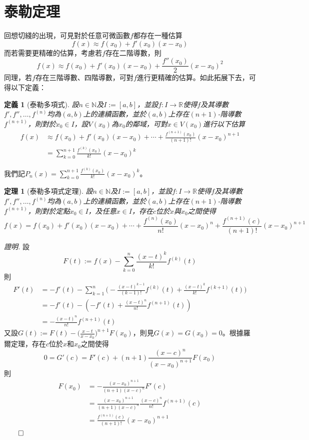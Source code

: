\documentclass[12pt]{article}
\newtheorem{definition}{定義}
\newtheorem*{theorem}{定理}
\renewenvironment*{proof}{\textit{證明.}}{\hfill$\qed$}
\begin{document}
    \section*{泰勒定理}

    回想切綫的出現，可見對於任意可微函數$f$都存在一種估算$$f(x)\approx f(x_0)+f'(x_0)(x-x_0)$$而若需要更精確的估算，考慮若$f$存在二階導數，則$$f(x)\approx f(x_0)+f'(x_0)(x-x_0)+\frac{f''(x_0)}{2}(x-x_0)^2$$同理，若$f$存在三階導數、四階導數，可對$f$進行更精確的估算。如此拓展下去，可得以下定義：

    \begin{definition}[泰勒多項式]
        設$n\in\mathbb{N}$及$I:=[a,b]$，並設$f:I\to\mathbb{R}$使得$f$及其導數$f',f'',\dots,f^{(n)}$均為$(a,b)$上的連續函數，並於$(a,b)$上存在$(n+1)$-階導數$f^{(n+1)}$，則對於$x_0\in I$，設$V(x_0)$為$x_0$的鄰域，可對$x\in V(x_0)$進行以下估算\begin{align*}
            f(x)&\approx f(x_0)+f'(x_0)(x-x_0)+\cdots+\frac{f^{(n+1)}(x_0)}{(n+1)!}(x-x_0)^{n+1}\\
            &=\sum_{k=0}^{n+1}\frac{f^{(k)}(x_0)}{k!}(x-x_0)^k
        \end{align*}
    \end{definition}

    我們記$\displaystyle P_n(x)=\sum_{k=0}^{n+1}\frac{f^{(k)}(x_0)}{k!}(x-x_0)^k$。

    \begin{theorem}[泰勒多項式定理]
        設$n\in\mathbb{N}$及$I:=[a,b]$，並設$f:I\to\mathbb{R}$使得$f$及其導數$f',f'',\dots,f^{(n)}$均為$(a,b)$上的連續函數，並於$(a,b)$上存在$(n+1)$-階導數$f^{(n+1)}$，則對於定點$x_0\in I$，及任意$x\in I$，存在$c$位於$x$與$x_0$之間使得$$f(x)= f(x_0)+f'(x_0)(x-x_0)+\cdots+\frac{f^{(n)}(x_0)}{n!}(x-x_0)^{n}+\frac{f^{(n+1)}(c)}{(n+1)!}(x-x_0)^{n+1}$$
    \end{theorem}

    \begin{proof}
        設$$F(t):=f(x)-\sum_{k=0}^{n}\frac{(x-t)^k}{k!}f^{(k)}(t)$$則\begin{align*}
            F'(t)&=-f'(t)-\sum_{k=1}^{n}\biggl(-\frac{(x-t)^{k-1}}{(k-1)!}f^{(k)}(t)+\frac{(x-t)^k}{k!}f^{(k+1)}(t)\biggr)\\
            &=-f'(t)-(-f'(t)+\frac{(x-t)^{n}}{n!}f^{(n+1)}(t))\\
            &=-\frac{(x-t)^{n}}{n!}f^{(n+1)}(t)
        \end{align*}
        又設$\displaystyle G(t):=F(t)-\biggl(\frac{x-t}{x-x_0}\biggr)^{n+1}F(x_0)$，則見$G(x)=G(x_0)=0$。根據羅爾定理，存在$c$位於$x$和$x_0$之間使得$$0=G'(c)=F'(c)+(n+1)\frac{(x-c)^{n}}{(x-x_0)^{n+1}}F(x_0)$$則\begin{align*}
            F(x_0)&=-\frac{(x-x_0)^{n+1}}{(n+1)(x-c)^n}F'(c)\\
            &=\frac{(x-x_0)^{n+1}}{(n+1)(x-c)^n}\frac{(x-c)^{n}}{n!}f^{(n+1)}(c)\\
            &=\frac{f^{(n+1)}(c)}{(n+1)!}(x-x_0)^{n+1}
        \end{align*}
    \end{proof}
\end{document}
